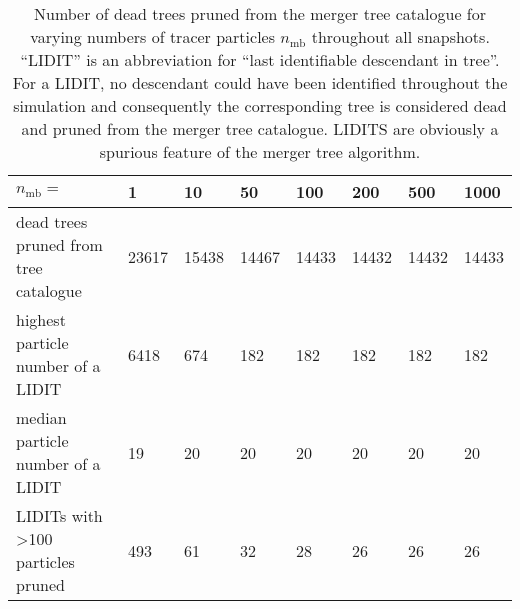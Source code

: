 \begin{table*}

  \caption{Number of dead trees pruned from the merger tree catalogue
    for varying numbers of tracer particles $n_{\mathrm{mb}}$ throughout
    all snapshots.  ``LIDIT'' is an abbreviation for ``last
    identifiable descendant in tree''.  For a LIDIT, no descendant
    could have been identified throughout the simulation and
    consequently the corresponding tree is considered dead and pruned
    from the merger tree catalogue. LIDITS are obviously a spurious
    feature of the merger tree algorithm.
    \label{tab:ntracers-pruning}
  }

  {\small
    \begin{tabular}[c]{l | p{0.8cm} | p{0.8cm} | p{0.8cm} | p{0.8cm} | p{0.8cm} | p{0.8cm} | p{0.8cm} |}
      $n_{\mathrm{mb}}=$				&	1 		& 	10 	& 	50 	& 100 	& 200 	& 500 	& 1000
      \\
      \hline
      dead trees pruned from tree catalogue	&	23617	&	15438	&	14467	& 14433 & 14432 & 14432 & 14433
      \\
      highest particle number of a LIDIT		&	6418	&	674		&	182		&	182 	& 182 	& 182 	& 182
      \\
      median particle number of a LIDIT			&	19		&	20		&	20		&	20 		& 20 		& 20 		& 20
      \\
      LIDITs with >100 particles pruned 		&	493		&	61		&	32		&	28 		& 26 		& 26 		& 26
      \\
      \hline
    \end{tabular}
  }
\end{table*}

